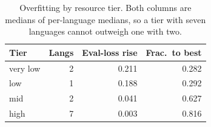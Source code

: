 \begin{table}[t]
\centering
\setlength{\tabcolsep}{4pt}
\begin{tabular}{@{}lrrr@{}}
\toprule
\textbf{Tier} & \textbf{Langs} & \textbf{Eval-loss rise} & \textbf{Frac.\ to best} \\
\midrule
very low & 2 & 0.211 & 0.282 \\
low & 1 & 0.188 & 0.292 \\
mid & 2 & 0.041 & 0.627 \\
high & 7 & 0.003 & 0.816 \\
\bottomrule
\end{tabular}
\caption{Overfitting by resource tier. Both columns are medians of per-language medians, so a tier with seven languages cannot outweigh one with two.}
\label{tab:loss-tier}
\end{table}

